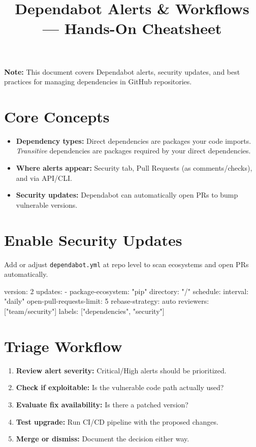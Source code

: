 \documentclass[11pt,letterpaper]{article}
\title{\textbf{Dependabot Alerts \& Workflows --- Hands-On Cheatsheet}}
\author{}
\date{}
\begin{document}
\maketitle

\begin{notebox}
\textbf{Note:} This document covers Dependabot alerts, security updates, and best practices for managing dependencies in GitHub repositories.
\end{notebox}

\section{Core Concepts}

\begin{itemize}
  \item \textbf{Dependency types:} Direct dependencies are packages your code imports. \textit{Transitive} dependencies are packages required by your direct dependencies.
  \item \textbf{Where alerts appear:} Security tab, Pull Requests (as comments/checks), and via API/CLI.
  \item \textbf{Security updates:} Dependabot can automatically open PRs to bump vulnerable versions.
\end{itemize}

\section{Enable Security Updates}

Add or adjust \texttt{dependabot.yml} at repo level to scan ecosystems and open PRs automatically.

\begin{yamlcode}
version: 2
updates:
  - package-ecosystem: "pip"
    directory: "/"
    schedule:
      interval: "daily"
    open-pull-requests-limit: 5
    rebase-strategy: auto
    reviewers: ["team/security"]
    labels: ["dependencies", "security"]
\end{yamlcode}

\section{Triage Workflow}

\begin{enumerate}
  \item \textbf{Review alert severity:} Critical/High alerts should be prioritized.
  \item \textbf{Check if exploitable:} Is the vulnerable code path actually used?
  \item \textbf{Evaluate fix availability:} Is there a patched version?
  \item \textbf{Test upgrade:} Run CI/CD pipeline with the proposed changes.
  \item \textbf{Merge or dismiss:} Document the decision either way.
\end{enumerate}
\end{document}
